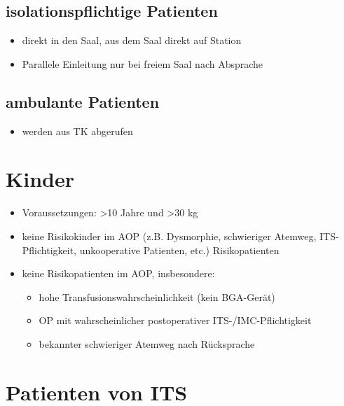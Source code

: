 \documentclass[
]{book}
\providecommand{\tightlist}{%
  \setlength{\itemsep}{0pt}\setlength{\parskip}{0pt}}
\begin{document}
\hypertarget{isolationspflichtige-patienten}{%
\subsection{isolationspflichtige Patienten}\label{isolationspflichtige-patienten}}

\begin{itemize}
\tightlist
\item
  direkt in den Saal, aus dem Saal direkt auf Station
\item
  Parallele Einleitung nur bei freiem Saal nach Absprache
\end{itemize}

\hypertarget{ambulante-patienten}{%
\subsection{ambulante Patienten}\label{ambulante-patienten}}

\begin{itemize}
\tightlist
\item
  werden aus TK abgerufen
\end{itemize}

\hypertarget{kinder}{%
\section{Kinder}\label{kinder}}

\begin{itemize}
\tightlist
\item
  Voraussetzungen: \textgreater10 Jahre und \textgreater30 kg
\item
  keine Risikokinder im AOP (z.B. Dysmorphie, schwieriger Atemweg, ITS-Pflichtigkeit, unkooperative Patienten, etc.) Risikopatienten
\item
  keine Risikopatienten im AOP, insbesondere:

  \begin{itemize}
  \tightlist
  \item
    hohe Transfusionswahrscheinlichkeit (kein BGA-Gerät)
  \item
    OP mit wahrscheinlicher postoperativer ITS-/IMC-Pflichtigkeit
  \item
    bekannter schwieriger Atemweg nach Rücksprache
  \end{itemize}
\end{itemize}

\hypertarget{patienten-von-its}{%
\section{Patienten von ITS}\label{patienten-von-its}}
\end{document}
